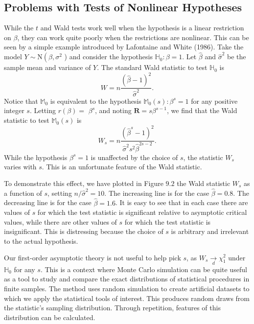 \documentclass[10pt]{article}
\begin{document}
\subsection{Problems with Tests of Nonlinear Hypotheses}
While the $t$ and Wald tests work well when the hypothesis is a linear restriction on $\beta$, they can work quite poorly when the restrictions are nonlinear. This can be seen by a simple example introduced by Lafontaine and White (1986). Take the model $Y \sim \mathrm{N}\left(\beta, \sigma^{2}\right.$ ) and consider the hypothesis $\mathbb{H}_{0}: \beta=1$. Let $\widehat{\beta}$ and $\widehat{\sigma}^{2}$ be the sample mean and variance of $Y$. The standard Wald statistic to test $\mathbb{H}_{0}$ is
$$
W=n \frac{(\widehat{\beta}-1)^{2}}{\widehat{\sigma}^{2}} .
$$
Notice that $\mathbb{M}_{0}$ is equivalent to the hypothesis $\mathbb{M}_{0}(s): \beta^{s}=1$ for any positive integer $s$. Letting $r(\beta)=$ $\beta^{s}$, and noting $\boldsymbol{R}=s \beta^{s-1}$, we find that the Wald statistic to test $\mathbb{M}_{0}(s)$ is
$$
W_{s}=n \frac{\left(\widehat{\beta}^{s}-1\right)^{2}}{\widehat{\sigma}^{2} s^{2} \widehat{\beta}^{2 s-2}} .
$$
While the hypothesis $\beta^{s}=1$ is unaffected by the choice of $s$, the statistic $W_{s}$ varies with $s$. This is an unfortunate feature of the Wald statistic.

To demonstrate this effect, we have plotted in Figure $9.2$ the Wald statistic $W_{s}$ as a function of $s$, setting $n / \widehat{\sigma}^{2}=10$. The increasing line is for the case $\widehat{\beta}=0.8$. The decreasing line is for the case $\widehat{\beta}=1.6$. It is easy to see that in each case there are values of $s$ for which the test statistic is significant relative to asymptotic critical values, while there are other values of $s$ for which the test statistic is insignificant. This is distressing because the choice of $s$ is arbitrary and irrelevant to the actual hypothesis.

Our first-order asymptotic theory is not useful to help pick $s$, as $W_{s} \underset{d}{\longrightarrow} \chi_{1}^{2}$ under $\mathbb{H}_{0}$ for any $s$. This is a context where Monte Carlo simulation can be quite useful as a tool to study and compare the exact distributions of statistical procedures in finite samples. The method uses random simulation to create artificial datasets to which we apply the statistical tools of interest. This produces random draws from the statistic's sampling distribution. Through repetition, features of this distribution can be calculated.
\end{document}
